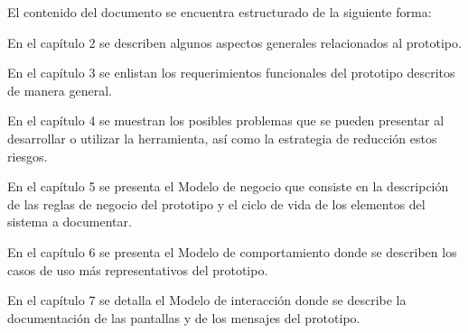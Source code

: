 El contenido del documento se encuentra estructurado de la siguiente forma:

\begin{Citemize}
	\item En el capítulo 2  se describen algunos aspectos generales relacionados al prototipo.
	\item En el capítulo 3  se enlistan los requerimientos funcionales del prototipo descritos de manera general.
	\item En el capítulo 4  se muestran los posibles problemas que se pueden presentar al desarrollar o utilizar la herramienta, así como la estrategia de reducción estos riesgos.
	\item En el capítulo 5  se presenta el Modelo de negocio que consiste en la descripción de las reglas de negocio del prototipo y el ciclo de vida de los elementos del sistema a documentar.
	\item En el capítulo 6  se presenta el Modelo de comportamiento donde se describen los casos de uso más representativos del prototipo.
	\item En el capítulo 7  se detalla el Modelo de interacción donde se describe la documentación de las pantallas y de los mensajes del prototipo.
\end{Citemize}


